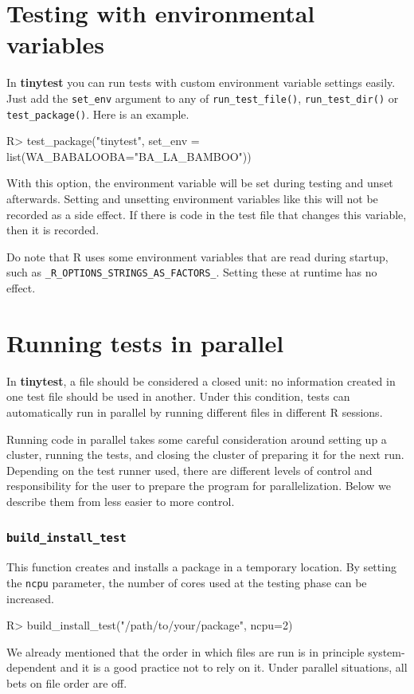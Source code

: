 \documentclass[11pt]{article}
\newcommand{\code}[1]{\texttt{#1}}
\newcommand{\pkg}[1]{\textbf{#1}}
\begin{document}
\section{Testing with environmental variables}
\label{sect:envvar}
In \pkg{tinytest} you can run tests with custom environment variable settings
easily. Just add the \code{set\_env} argument to any of \code{run\_test\_file()},
\code{run\_test\_dir()} or \code{test\_package()}. Here is an example.
\begin{Schunk}
\begin{Sinput}
R> test_package("tinytest", set_env = list(WA_BABALOOBA="BA_LA_BAMBOO"))
\end{Sinput}
\end{Schunk}
With this option, the environment variable will be set during testing and unset
afterwards. Setting and unsetting environment variables like this will not be
recorded as a side effect. If there is code in the test file that changes this
variable, then it is recorded.

Do note that R uses some environment variables that are read during startup,
such as \code{\_R\_OPTIONS\_STRINGS\_AS\_FACTORS\_}. Setting these at runtime
has no effect.



\section{Running tests in parallel}
In \pkg{tinytest}, a file should be considered a closed unit: no information
created in one test file should be used in another.  Under this condition,
tests can automatically run in parallel by running different files in different
R sessions.

Running code in parallel takes some careful consideration around setting up a
cluster, running the tests, and closing the cluster of preparing it for the
next run. Depending on the test runner used, there are different levels of
control and responsibility for the user to prepare the program for
parallelization. Below we describe them from less easier to more control.

\subsubsection*{\code{build\_install\_test}}
This function creates and installs a package in a temporary
location. By setting the \code{ncpu} parameter, the number of
cores used at the testing phase can be increased.
\begin{Schunk}
\begin{Sinput}
R> build_install_test("/path/to/your/package", ncpu=2)
\end{Sinput}
\end{Schunk}
We already mentioned that the order in which files are run is in principle
system-dependent and it is a good practice not to rely on it. Under parallel
situations, all bets on file order are off.
\end{document}

